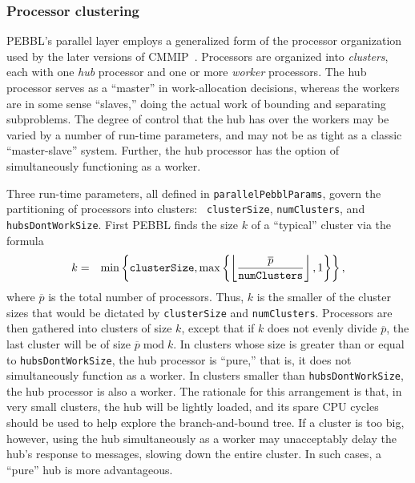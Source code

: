 \subsubsection{Processor clustering}
\label{sec:clustering}
PEBBL's parallel layer employs a generalized form of the processor
organization used by the later versions of CMMIP~\cite{Eck94,Eck97}.
Processors are organized into \emph{clusters}, each with one
\emph{hub} processor and one or more \emph{worker} processors.  The
hub processor serves as a ``master'' in work-allocation decisions,
whereas the workers are in some sense ``slaves,'' doing the actual
work of bounding and separating subproblems. The degree of control
that the hub has over the workers may be varied by a number of
run-time parameters, and may not be as tight as a classic
``master-slave'' system.  Further, the hub processor has the option of
simultaneously functioning as a worker.

Three run-time parameters, all defined in \texttt{parallelPebblParams},
govern the partitioning of processors into clusters: {\tt
clusterSize}, \texttt{numClusters}, and \texttt{hubsDontWorkSize}.  First
PEBBL finds the size $k$ of a ``typical'' cluster via the formula
\begin{eqnarray*}
k &= &
\min \left\{ 
\mbox{\tt clusterSize},
\max \left\{
\left\lfloor \frac{\overline{p}}{\mbox{\tt numClusters}}
\right\rfloor,
1
\right\}
\right\} ,
\end{eqnarray*}
where $\overline{p}$ is the total number of processors.  Thus, $k$ is
the smaller of the cluster sizes that would be dictated by
\texttt{clusterSize} and \texttt{numClusters}.  Processors are then
gathered into clusters of size $k$, except that if $k$ does not evenly
divide $\overline{p}$, the last cluster will be of size
$\overline{p}\; \mbox{mod}\;k$.
In clusters whose size is greater than or equal to
\texttt{hubsDontWorkSize}, the hub processor is ``pure,'' that is, it
does not simultaneously function as a worker.  In clusters smaller
than \texttt{hubsDontWorkSize}, the hub processor is also a worker.
The rationale for this arrangement is that, in very small clusters,
the hub will be lightly loaded, and its spare CPU cycles should be
used to help explore the branch-and-bound tree.  If a cluster is too
big, however, using the hub simultaneously as a worker may
unacceptably delay the hub's response to messages, slowing down the
entire cluster.  In such cases, a ``pure'' hub is more advantageous.


